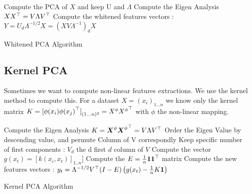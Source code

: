		\begin{algorithm}[H]
				Compute the PCA of $X$ and keep U and $\Lambda$\;
				Compute the Eigen Analysis $X X^\top = V \Lambda V ^\top$ \;
				Compute the whitened features vectors : $Y = U_d \Lambda ^{-1/2} X = (X V \Lambda ^{-1})_d X $
				\caption{Whitened PCA Algorithm}
			\end{algorithm}

	

	\subsection{Kernel PCA} %
		\label{sub:kernel_pca}
	
		Sometimes we want to compute non-linear features extractions. We use the kernel method to compute this. For a dataset $X = (x_i)_{1...n}$ we know only the kernel
		 matrix $K = {[\phi(x_i) {\phi(x_j)} ^\top]}_{(1...n)^2} = X^{\phi} {X^{\phi}} ^\top $ with $\phi$ the non-linear mapping.

		\begin{algorithm}[H]
				Compute the Eigen Analysis $K = {\boldsymbol{{X}}}^{\phi} {{\boldsymbol{{X}}}^{\phi}} ^\top = V \Lambda {V }^\top$ \;
				Order the Eigen Value by descending value, and permute Column of V correspondly\;
				Keep specific number of first components : $V_d$ the d first $d$ column of $V$ \;
				Compute the vector $g(x_t) = [k(x_i, x_t)]_{1..n}]$ \;
				Compute the $E = \frac{1}{n}{\boldsymbol{{1}}} {\boldsymbol{{1}}} ^\top $ matrix \;
				Compute the new features vectors : $y_t = \Lambda^{-1/2} V ^\top (I - E)\left( g(x_t)-\frac{1}{n} K {\boldsymbol{{1}}} \right)$ 
				\caption{Kernel PCA Algorithm}
			\end{algorithm}
	
